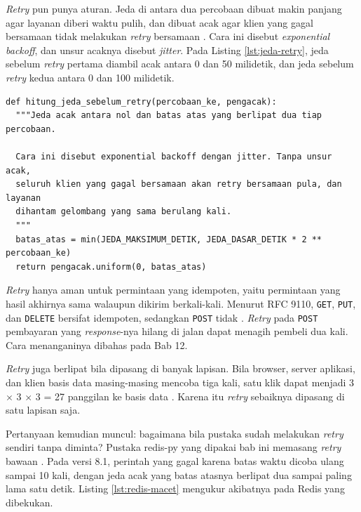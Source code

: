 \textit{Retry} pun punya aturan. Jeda di antara dua percobaan dibuat makin
panjang agar layanan diberi waktu pulih, dan dibuat acak agar klien yang gagal
bersamaan tidak melakukan \textit{retry} bersamaan \cite{brooker2019timeouts}.
Cara ini disebut \textit{exponential backoff}, dan unsur acaknya disebut
\textit{jitter}. Pada Listing \ref{lst:jeda-retry}, jeda sebelum \textit{retry}
pertama diambil acak antara 0 dan 50 milidetik, dan jeda sebelum \textit{retry}
kedua antara 0 dan 100 milidetik.

\begin{lstlisting}[style=PythonStyle, caption={\textit{Exponential backoff} dengan \textit{jitter}, tersedia di \berkas{sources/chapter04/resilience.py}}, label={lst:jeda-retry}]
def hitung_jeda_sebelum_retry(percobaan_ke, pengacak):
  """Jeda acak antara nol dan batas atas yang berlipat dua tiap percobaan.

  Cara ini disebut exponential backoff dengan jitter. Tanpa unsur acak,
  seluruh klien yang gagal bersamaan akan retry bersamaan pula, dan layanan
  dihantam gelombang yang sama berulang kali.
  """
  batas_atas = min(JEDA_MAKSIMUM_DETIK, JEDA_DASAR_DETIK * 2 ** percobaan_ke)
  return pengacak.uniform(0, batas_atas)
\end{lstlisting}

\textit{Retry} hanya aman untuk permintaan yang idempoten, yaitu permintaan
yang hasil akhirnya sama walaupun dikirim berkali-kali. Menurut RFC 9110,
\texttt{GET}, \texttt{PUT}, dan \texttt{DELETE} bersifat idempoten, sedangkan
\texttt{POST} tidak \cite{rfc9110}. \textit{Retry} pada \texttt{POST}
pembayaran yang \textit{response}-nya hilang di jalan dapat menagih pembeli dua kali. Cara
menanganinya dibahas pada Bab 12.

\textit{Retry} juga berlipat bila dipasang di banyak lapisan. Bila browser,
server aplikasi, dan klien basis data masing-masing mencoba tiga kali, satu
klik dapat menjadi 3 $\times$ 3 $\times$ 3 = 27 panggilan ke basis data
\cite{ulrich2016cascading}. Karena itu \textit{retry} sebaiknya dipasang di
satu lapisan saja.

Pertanyaan kemudian muncul: bagaimana bila pustaka sudah melakukan
\textit{retry} sendiri tanpa diminta? Pustaka redis-py yang dipakai bab ini
memasang \textit{retry} bawaan \cite{redispy-retry}. Pada versi 8.1, perintah
yang gagal karena batas waktu dicoba ulang sampai 10 kali, dengan jeda acak
yang batas atasnya berlipat dua sampai paling lama satu detik. Listing \ref{lst:redis-macet} mengukur
akibatnya pada Redis yang dibekukan.

